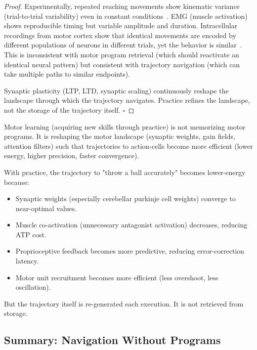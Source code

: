 \begin{proof}
Experimentally, repeated reaching movements show kinematic variance (trial-to-trial variability) even in constant conditions~\cite{TortorielloNichols2000}. EMG (muscle activation) shows reproducible timing but variable amplitude and duration. Intracellular recordings from motor cortex show that identical movements are encoded by different populations of neurons in different trials, yet the behavior is similar~\cite{RothschildPouget2017}. This is inconsistent with motor program retrieval (which should reactivate an identical neural pattern) but consistent with trajectory navigation (which can take multiple paths to similar endpoints).

Synaptic plasticity (LTP, LTD, synaptic scaling) continuously reshape the landscape through which the trajectory navigates. Practice refines the landscape, not the storage of the trajectory itself. $\square$
\end{proof}

\begin{corollary}
\label{cor:learning-landscape}
Motor learning (acquiring new skills through practice) is not memorizing motor programs. It is reshaping the motor landscape (synaptic weights, gain fields, attention filters) such that trajectories to action-cells become more efficient (lower energy, higher precision, faster convergence).

With practice, the trajectory to "throw a ball accurately" becomes lower-energy because:
\begin{itemize}[noitemsep]
\item Synaptic weights (especially cerebellar purkinje cell weights) converge to near-optimal values.
\item Muscle co-activation (unnecessary antagonist activation) decreases, reducing ATP cost.
\item Proprioceptive feedback becomes more predictive, reducing error-correction latency.
\item Motor unit recruitment becomes more efficient (less overshoot, less oscillation).
\end{itemize}

But the trajectory itself is re-generated each execution. It is not retrieved from storage.
\end{corollary}

\subsection{Summary: Navigation Without Programs}
\label{subsec:neuro-summary}


